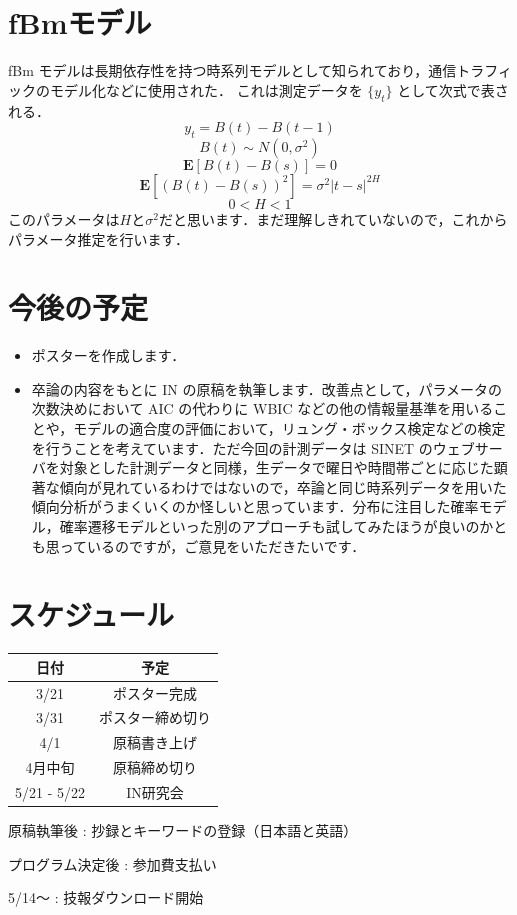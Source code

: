 \documentclass[a4j]{jarticle}
\begin{document}
\section{fBmモデル}
fBm モデルは長期依存性を持つ時系列モデルとして知られており，通信トラフィックのモデル化などに使用された\cite{rizk2012non}．
これは測定データを $\{y_t\}$ として次式で表される\cite{perrin2002fast}．
$$y_t = B(t) - B(t-1)$$
$$B(t) \sim N(0,\sigma^2)$$
$$\textbf{E}[B(t)-B(s)] = 0$$
$$\textbf{E}[(B(t)-B(s))^2] = \sigma^2|t-s|^{2H}$$
$$0<H<1$$
このパラメータは$ H と \sigma^2 $だと思います．まだ理解しきれていないので，これからパラメータ推定を行います． 
\section{今後の予定}
\begin{itemize}
\item ポスターを作成します．
\item 卒論の内容をもとに IN の原稿を執筆します．改善点として，パラメータの次数決めにおいて AIC の代わりに WBIC\cite{watanabe2013waic} などの他の情報量基準を用いることや，モデルの適合度の評価において，リュング・ボックス検定\cite{asai1999ana}などの検定を行うことを考えています．ただ今回の計測データは SINET のウェブサーバを対象とした計測データと同様，生データで曜日や時間帯ごとに応じた顕著な傾向が見れているわけではないので，卒論と同じ時系列データを用いた傾向分析がうまくいくのか怪しいと思っています．分布に注目した確率モデル，確率遷移モデルといった別のアプローチも試してみたほうが良いのかとも思っているのですが，ご意見をいただきたいです．
\end{itemize}
\section{スケジュール}
\begin{table}[H]
\begin{tabular}{|c|c|}
\hline
日付&予定\\
\hline
3/21&ポスター完成\\
\hline
3/31&ポスター締め切り\\
\hline
4/1&原稿書き上げ\\
\hline
4月中旬&原稿締め切り\\
\hline
5/21 - 5/22&IN研究会\\
\hline
\end{tabular}
\end{table}
原稿執筆後 : 抄録とキーワードの登録（日本語と英語）

プログラム決定後 : 参加費支払い

5/14～ : 技報ダウンロード開始



\end{document}
